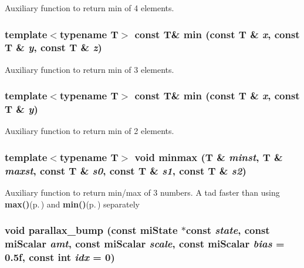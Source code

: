 Auxiliary function to return min of 4 elements. 

\subsubsection{\setlength{\rightskip}{0pt plus 5cm}template$<$typename T$>$ const T\& min (const T \& {\em x}, const T \& {\em y}, const T \& {\em z})\hspace{0.3cm}{\tt  [inline]}}\label{namespacemr_a54}


Auxiliary function to return min of 3 elements. 

\subsubsection{\setlength{\rightskip}{0pt plus 5cm}template$<$typename T$>$ const T\& min (const T \& {\em x}, const T \& {\em y})\hspace{0.3cm}{\tt  [inline]}}\label{namespacemr_a53}


Auxiliary function to return min of 2 elements. 

\subsubsection{\setlength{\rightskip}{0pt plus 5cm}template$<$typename T$>$ void minmax (T \& {\em minst}, T \& {\em maxst}, const T \& {\em s0}, const T \& {\em s1}, const T \& {\em s2})\hspace{0.3cm}{\tt  [inline]}}\label{namespacemr_a59}


Auxiliary function to return min/max of 3 numbers. A tad faster than using {\bf max()}{\rm (p.\,\pageref{namespacemr_a56})} and {\bf min()}{\rm (p.\,\pageref{namespacemr_a53})} separately 
\subsubsection{\setlength{\rightskip}{0pt plus 5cm}void parallax\_\-bump (const mi\-State $\ast$const {\em state}, const mi\-Scalar {\em amt}, const mi\-Scalar {\em scale}, const mi\-Scalar {\em bias} = 0.5f, const int {\em idx} = 0)\hspace{0.3cm}{\tt  [inline]}}\label{namespacemr_a21}


